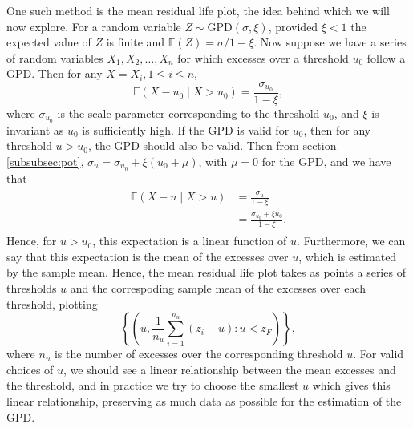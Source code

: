 \documentclass{article}
\numberwithin{equation}{section}
\begin{document}
One such method is the mean residual life plot, the idea behind which we will now explore. %
For a random variable $Z \sim \text{GPD}(\sigma, \xi)$, provided $\xi < 1$ the expected value of $Z$ is finite and $\mathbb{E}(Z) = \sigma/1 - \xi$.
Now suppose we have a series of random variables $X_1, X_2, \ldots, X_n$ for which excesses over a threshold $u_0$ follow a GPD. 
Then for any $X = X_i, 1 \le i \le n$, 
\[
  \mathbb{E}(X - u_0 \mid X > u_0) = \frac{\sigma_{u_0}}{1 - \xi},
\]
where $\sigma_{u_0}$ is the scale parameter corresponding to the threshold $u_0$, and $\xi$ is invariant as $u_0$ is sufficiently high.
If the GPD is valid for $u_0$, then for any threshold $u > u_0$, the GPD should also be valid.
Then from section \ref{subsubsec:pot}, $\sigma_u = \sigma_{u_0} + \xi(u_0 + \mu)$, with $\mu = 0$ for the GPD, and we have that %
\begin{align} \label{eq:lin_u}
  \begin{split}
  \mathbb{E}(X - u \mid X > u) &= \frac{\sigma_u}{1 - \xi} \\
                                   &= \frac{\sigma_{u_0} + \xi u_0}{1-\xi}.
  \end{split}
\end{align}
Hence, for $u > u_0$, this expectation is a linear function of $u$. 
Furthermore, we can say that this expectation is the mean of the excesses over $u$, which is estimated by the sample mean. 
Hence, the mean residual life plot takes as points a series of thresholds $u$ and the correspoding sample mean of the excesses over each threshold, plotting
\[
  \left\{\left( u, \frac{1}{n_u} \sum_{i=1}^{n_u}{\left(z_i - u\right)}: u < z_{F} \right) \right\},
\]
where $n_u$ is the number of excesses over the corresponding threshold $u$.
For valid choices of $u$, we should see a linear relationship between the mean excesses and the threshold, and in practice we try to choose the smallest $u$ which gives this linear relationship, preserving as much data as possible for the estimation of the GPD.
\end{document}
